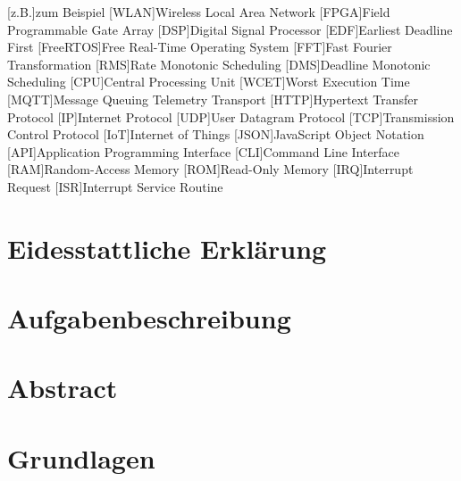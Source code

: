 \documentclass{scrartcl}
\begin{document}
\begin{acronym}[abkuerzungen]
	[z.B.]{zum Beispiel}
	[WLAN]{Wireless Local Area Network}
	[FPGA]{Field Programmable Gate Array}
	[DSP]{Digital Signal Processor}
	[EDF]{Earliest Deadline First}
	[FreeRTOS]{Free Real-Time Operating System}
	[FFT]{Fast Fourier Transformation}
	[RMS]{Rate Monotonic Scheduling}
	[DMS]{Deadline Monotonic Scheduling}
	[CPU]{Central Processing Unit}
	[WCET]{Worst Execution Time}
	[MQTT]{Message Queuing Telemetry Transport}
	[HTTP]{Hypertext Transfer Protocol}
	[IP]{Internet Protocol}
	[UDP]{User Datagram Protocol}
	[TCP]{Transmission Control Protocol}
	[IoT]{Internet of Things}
	[JSON]{JavaScript Object Notation}
	[API]{Application Programming Interface}
	[CLI]{Command Line Interface}
	[RAM]{Random-Access Memory}
	[ROM]{Read-Only Memory}
	[IRQ]{Interrupt Request}
	[ISR]{Interrupt Service Routine}
\end{acronym}


\begin{titlepage}
		
	\end{titlepage}
	\clearpage 
	\section*{Eidesstattliche Erklärung}
		
		\clearpage
	\section*{Aufgabenbeschreibung}
		
		\clearpage
	\section*{Abstract}
		
		\clearpage
	\tableofcontents
		\clearpage
	\clearpage
	\section{Grundlagen}
		
\end{document}
